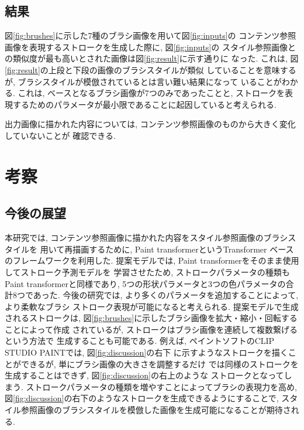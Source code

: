 \documentclass[MIRU,submit,uplatex]{miru2023j}
\begin{document}
\subsection{結果}
図\ref{fig:brushes}に示した7種のブラシ画像を用いて図\ref{fig:inputs}の
コンテンツ参照画像を表現するストロークを生成した際に, 図\ref{fig:inputs}の
スタイル参照画像との類似度が最も高いとされた画像は図\ref{fig:result}に示す通りに
なった. これは, 図\ref{fig:result}の上段と下段の画像のブラシスタイルが類似
していることを意味するが, ブラシスタイルが模倣されているとは言い難い結果になって
いることがわかる. これは, ベースとなるブラシ画像が7つのみであったことと,
ストロークを表現するためのパラメータが最小限であることに起因していると考えられる.

出力画像に描かれた内容については, コンテンツ参照画像のものから大きく変化していないことが
確認できる. 

\section{考察}
\subsection{今後の展望}
本研究では, コンテンツ参照画像に描かれた内容をスタイル参照画像のブラシスタイルを
用いて再描画するために, Paint transformer\cite{liu2021paint}というTransformer
ベースのフレームワークを利用した. 
提案モデルでは, Paint transformerをそのまま使用してストローク予測モデルを
学習させたため, ストロークパラメータの種類もPaint transformerと同様であり,  
5つの形状パラメータと3つの色パラメータの合計8つであった. 
今後の研究では, より多くのパラメータを追加することによって, より柔軟なブラシ
ストローク表現が可能になると考えられる. 提案モデルで生成されるストロークは, 
図\ref{fig:brushes}に示したブラシ画像を拡大・縮小・回転することによって作成
されているが, ストロークはブラシ画像を連続して複数繋げるという方法で
生成することも可能である. 
例えば, ペイントソフトのCLIP STUDIO PAINT\cite{ClipStudio}では, 図\ref{fig:discussion}の右下
に示すようなストロークを描くことができるが, 単にブラシ画像の大きさを調整するだけ
では同様のストロークを生成することはできず, 図\ref{fig:discussion}の右上のような
ストロークとなってしまう. 
ストロークパラメータの種類を増やすことによってブラシの表現力を高め, 
図\ref{fig:discussion}の右下のようなストロークを生成できるようにすることで, 
スタイル参照画像のブラシスタイルを模倣した画像を生成可能になることが期待される.
\end{document}
